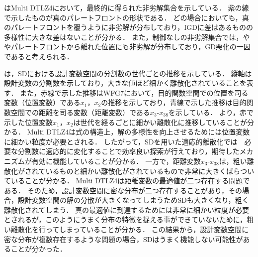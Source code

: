 \documentclass[../main/main]{subfiles}
\begin{document}
はMulti DTLZ4において，最終的に得られた非劣解集合を示している．
紫の線で示したものが真のパレートフロントの形状である．
どの場合においても，真のパレートフロントを覆うように非劣解が分布しており，IGDに差はあるものの多様性に大きな差はないことが分かる．
また，制御なしの非劣解集合では，ややパレートフロントから離れた位置にも非劣解が分布しており，GD悪化の一因であると考えられる．

は，SDにおける設計変数空間の分割数の世代ごとの推移を示している．
縦軸は設計変数の分割数を示しており，大きな値ほど細かく離散化されていることを表す．
また，赤線で示した推移はWFG7において，目的関数空間での位置を司る変数（位置変数）である$x_1$，$x_2$の推移を示しており，青線で示した推移は目的関数空間での距離を司る変数（距離変数）である$x_3$-$x_{38}$を示している．
より，赤で示した位置変数$x_1$，$x_2$は世代を経るごとに細かい離散化に推移していることが分かる．
Multi DTLZ4は式の構造上，解の多様性を向上させるためには位置変数に細かい粒度が必要とされる．
したがって，SDを用いた適応的離散化では　必要な分割数に適応的に変化することで効率良い探索が行えており，期待したメカニズムが有効に機能していることが分かる．
一方で，距離変数$x_3$-$x_{38}$は，粗い離散化がされているものと細かい離散化がされているもので非常に大きくばらついていることが分かる．
Multi DTLZ4は距離変数の最適値が二つ存在する問題である．
そのため，設計変数空間に密な分布が二つ存在することがあり，その場合，設計変数空間の解の分散が大きくなってしまうためSDも大きくなり，粗く離散化されてしまう．
真の最適値に到達するためには非常に細かい粒度が必要とされるが，このようにうまく分布の特徴を捉える事ができていないために，粗い離散化を行ってしまっていることが分かる．
この結果から，設計変数空間に密な分布が複数存在するような問題の場合，SDはうまく機能しない可能性があることが分かった．
\end{document}
